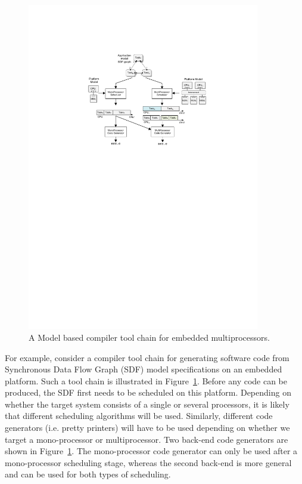 \begin{figure}[!t]
\centering
\includegraphics[width=4in]{fig/SDF-flow.pdf}
\caption{A Model based compiler tool chain for embedded multiprocessors. 
}
\label{fig:toolchain}
\end{figure}


For example, consider a compiler tool chain for generating software code from 
Synchronous Data Flow Graph (SDF) model specifications on an embedded
platform. Such a tool chain is illustrated in Figure~\ref{fig:toolchain}.
Before any code can be produced, the SDF first needs to be scheduled on
this platform. Depending on whether the target system consists of a single or
several processors, it is likely that different scheduling algorithms will be
used. Similarly, different code generators (i.e. pretty printers) will have to
be used depending on whether we target a mono-processor or multiprocessor. Two back-end code generators are 
shown in Figure~\ref{fig:toolchain}. The mono-processor code generator can only be used after a mono-processor 
scheduling stage, whereas the second back-end is more general and can be used for 
both types of scheduling.     

